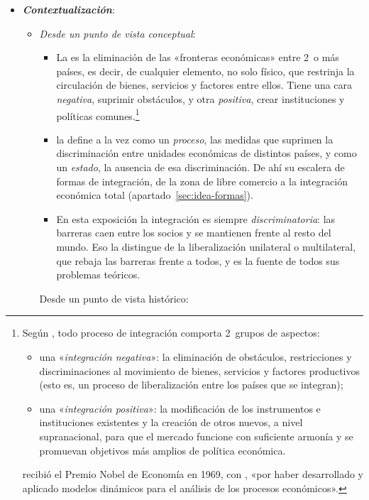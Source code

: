 \documentclass[11pt]{article}
\begin{document}
\begin{itemize}
\item \textbf{\emph{Contextualización}}:
  \begin{itemize}
  \item \emph{Desde un punto de vista conceptual}:
  \begin{itemize}
  \item La  es la eliminación de las «fronteras económicas» entre 2~o más países, es decir, de cualquier elemento, no solo físico, que restrinja la circulación de bienes, servicios y factores entre ellos\nocite{Pelkmans2006European}. Tiene una cara \emph{negativa}, suprimir obstáculos, y otra \emph{positiva}, crear instituciones y políticas comunes\nocite{Tinbergen1954International}.\footnote{Según \textcite{Tinbergen1954International}, todo proceso de integración comporta 2~grupos de aspectos:
\begin{itemize}
\item una «\emph{integración negativa}»: la eliminación de obstáculos, restricciones y discriminaciones al movimiento de bienes, servicios y factores productivos (esto es, un proceso de liberalización entre los países que se integran);
\item una «\emph{integración positiva}»: la modificación de los instrumentos e instituciones existentes y la creación de otros nuevos, a nivel supranacional, para que el mercado funcione con suficiente armonía y se promuevan objetivos más amplios de política económica.
\end{itemize}
 recibió el Premio Nobel de Economía en 1969, con , «por haber desarrollado y aplicado modelos dinámicos para el análisis de los procesos económicos»\nocite{Nobel1969}.}
  \item \textcite{Balassa1961Theory} la define a la vez como un \emph{proceso}, las medidas que suprimen la discriminación entre unidades económicas de distintos países, y como un \emph{estado}, la ausencia de esa discriminación. De ahí su escalera de formas de integración, de la zona de libre comercio a la integración económica total (apartado~\ref{sec:idea-formas}).
  \item En esta exposición la integración es siempre \emph{discriminatoria}: las barreras caen entre los socios y se mantienen frente al resto del mundo. Eso la distingue de la liberalización unilateral o multilateral, que rebaja las barreras frente a todos, y es la fuente de todos sus problemas teóricos.
  \end{itemize}
  Desde un punto de vista histórico:

\end{itemize}
\end{itemize}
\end{document}
